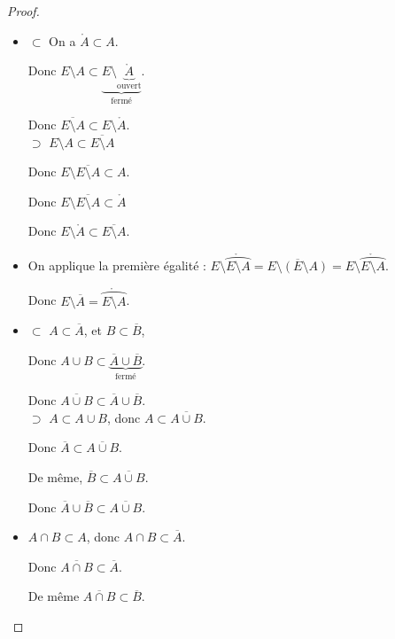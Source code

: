 \begin{proof}~\\
    \begin{itemize}
        \item $\subset$
        On a $\mathring A \subset A$. 

        Donc $E \setminus A \subset \underbrace{E \setminus \underbrace{\mathring A}_{\text{ouvert}}}_{\text{fermé}}$.

        Donc $\overline{E \setminus A} \subset E \setminus \mathring A$. \\

        $\supset$ $E \setminus A \subset \overline{E \setminus A}$

        Donc $E \setminus \overline{E \setminus A} \subset A$.

        Donc $E \setminus \overline{E \setminus A} \subset \mathring A$ 

        Donc $E \setminus \mathring A \subset \overline{E \setminus A}$. 

        \item On applique la première égalité :
        $E \setminus \mathring{\overparen{E \setminus A}} = \overline{E \setminus (E \setminus A)} = E \setminus \mathring{\overparen{E \setminus A}}$.

        Donc $E \setminus \overline A = \mathring{\overparen{E \setminus A}}$.

        \item $\subset$ $A \subset \overline A$, et $B \subset \overline B$,

        Donc $A \cup B \subset \underbrace{\overline A \cup \overline B}_{\text{fermé}}$.

        Donc $\overline{A \cup B} \subset \overline A \cup \overline B$. \\

        $\supset$ $A \subset A \cup B$, donc $A \subset \overline{A \cup B}$.

        Donc $\overline A \subset \overline{A \cup B}$.

        De même, $\overline B \subset \overline{A \cup B}$.

        Donc $\overline A \cup \overline B \subset \overline{A \cup B}$.

        \item 
        $A \cap B \subset A$, donc $A \cap B \subset \overline A$. 

        Donc $\overline {A \cap B} \subset \overline A$.

        De même $\overline {A \cap B} \subset \overline B$.


\end{itemize}
\end{proof}
